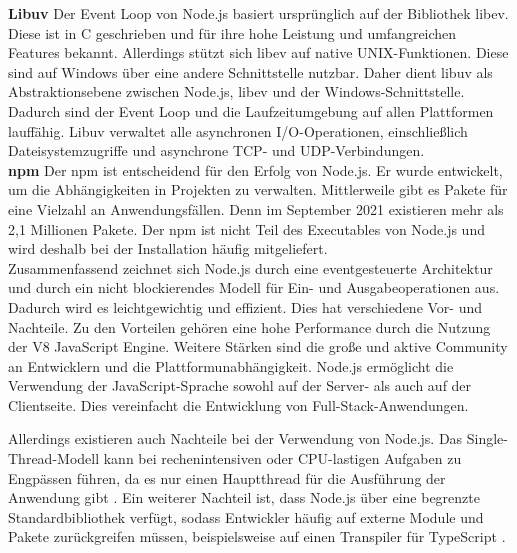 \noindent
\textbf{\glq Libuv\grq{}} \newline
Der Event Loop von Node.js basiert ursprünglich auf der Bibliothek \glq libev\grq{}. Diese ist in C geschrieben und für ihre hohe Leistung und umfangreichen Features bekannt. Allerdings stützt sich \glq libev\grq{} auf native UNIX-Funktionen. Diese sind auf Windows über eine andere Schnittstelle nutzbar. Daher dient \glq libuv\grq{} als Abstraktionsebene zwischen Node.js, libev und der Windows-Schnittstelle. Dadurch sind der Event Loop und die Laufzeitumgebung auf allen Plattformen lauffähig. \glq Libuv\grq{} verwaltet alle asynchronen I/O-Operationen, einschließlich Dateisystemzugriffe und asynchrone TCP- und UDP-Verbindungen.\cite{Springer.2022} \\

\noindent
\textbf{\ac{npm}} \newline
Der \ac{npm} ist entscheidend für den Erfolg von Node.js. Er wurde entwickelt, um die Abhängigkeiten in Projekten zu verwalten. Mittlerweile gibt es Pakete für eine Vielzahl an Anwendungsfällen. Denn im September 2021 existieren mehr als 2,1 Millionen Pakete. Der \ac{npm} ist nicht Teil des Executables von Node.js und wird deshalb bei der Installation häufig mitgeliefert. \cite{Springer.2022, OpenJSFoundation.2022b}\\

\noindent
Zusammenfassend zeichnet sich Node.js durch eine eventgesteuerte Architektur und durch ein nicht blockierendes Modell für Ein- und Ausgabeoperationen aus. Dadurch wird es leichtgewichtig und effizient. Dies hat verschiedene Vor- und Nachteile.\newline
Zu den Vorteilen gehören eine hohe Performance durch die Nutzung der V8 JavaScript Engine. Weitere Stärken sind die große und aktive Community an Entwicklern und die Plattformunabhängigkeit. Node.js ermöglicht die Verwendung der JavaScript-Sprache sowohl auf der Server- als auch auf der Clientseite. Dies vereinfacht die Entwicklung von Full-Stack-Anwendungen.\cite{Brown.November2019, OpenJSFoundation.2022b}\

\noindent
Allerdings existieren auch Nachteile bei der Verwendung von Node.js. Das Single-Thread-Modell kann bei rechenintensiven oder CPU-lastigen Aufgaben zu Engpässen führen, da es nur einen Hauptthread für die Ausführung der Anwendung gibt  \cite{Chhetri.2016}. Ein weiterer Nachteil ist, dass Node.js über eine begrenzte Standardbibliothek verfügt, sodass Entwickler häufig auf externe Module und Pakete zurückgreifen müssen, beispielsweise auf einen Transpiler für TypeScript \cite{OpenJSFoundation.2022b}.

